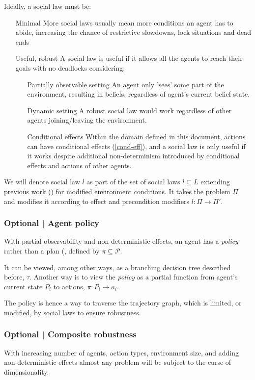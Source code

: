 \documentclass[fleqn,10pt]{olplainarticle}
\begin{document}
Ideally, a social law must be:
\begin{itemize}
    \item [Minimal] More social laws usually mean more conditions an agent has to abide, increasing the chance of restrictive slowdowns, lock situations and dead ends
    \item [Useful, robust] A social law is useful if it allows all the agents to reach their goals with no deadlocks considering:
    \begin{itemize}
        \item [Partially observable setting] An agent only 'sees' some part of the environment, resulting in beliefs, regardless of agent's current belief state. 
        \item [Dynamic setting] A robust social law would work regardless of other agents joining/leaving the environment.
        \item [Conditional effects] Within the domain defined in this document, actions can have conditional effects (\ref{cond-eff}), and a social law is only useful if it works despite additional non-determinism introduced by conditional effects and actions of other agents.
    \end{itemize}
\end{itemize}

\label{soc-law}
We will denote social law $l$ as part of the set of social laws $l \subseteq L$ extending previous work (\cite{karpas_automated_2017}) for modified environment conditions. It takes the problem $\Pi$ and modifies it according to effect and precondition modifiers $l: \Pi \rightarrow \Pi'$. 

\subsubsection{Optional | Agent policy}
With partial observability and non-deterministic effects, an agent has a \textit{policy} rather than a plan (\cite{muise_computing_2014}, defined by $\pi \subseteq \mathcal P$.

It can be viewed, among other ways, as a branching decision tree described before, $\tau$. Another way is to view the \textit{policy} as a partial function from agent's current state $P_i$ to actions, $\pi: P_i \rightarrow a_i$.

The policy is hence a way to traverse the trajectory graph, which is limited, or modified, by social laws to ensure robustness.

\subsubsection{Optional | Composite robustness} \label{comp-rob}
With increasing number of agents, action types, environment size, and adding non-deterministic effects almost any problem will be subject to the curse of dimensionality. 
\end{document}
